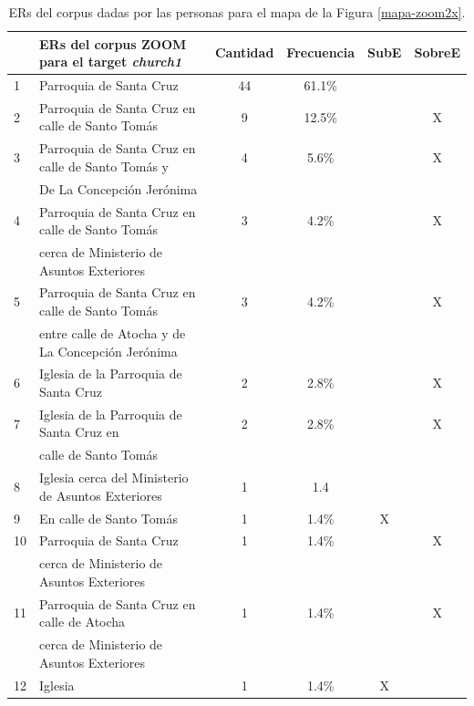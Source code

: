\begin{table}[H]
{\footnotesize
\begin{center}
\begin{tabular}{|l|l|c|c|c|c|}
\hline
&ERs del corpus ZOOM para el target {\it church1}	      & Cantidad &  Frecuencia & SubE&SobreE \\ \hline \hline
1&Parroquia de Santa Cruz        												 &		44&	61.1\%  &  & \\ \hline
2&Parroquia de Santa Cruz en calle de Santo Tom\'as        &    9 &	12.5\%	& &X\\ \hline
3&Parroquia de Santa Cruz en calle de Santo Tom\'as y      &    4 &     5.6\%      & &X\\
&De La Concepci\'on Jer\'onima                             &      &             & & \\ \hline
4&Parroquia de Santa Cruz en calle de Santo Tom\'as        &    3 &     4.2\%      &&X\\
&cerca de Ministerio de Asuntos Exteriores                 &      &             & &\\  \hline
5&Parroquia de Santa Cruz en calle de Santo Tom\'as        &	3 &	4.2\%	& &X\\
&entre calle de Atocha y de La Concepci\'on Jer\'onima     &	  &			&  &\\  \hline
6&Iglesia de la Parroquia de Santa Cruz			   &	2 &	2.8\%	&&X\\  \hline
7&Iglesia de la Parroquia de Santa Cruz	en      	   &	2 &	2.8\%	&&X\\  
&calle de Santo Tom\'as													 				 &		 &	    &  & \\ \hline
8&Iglesia cerca del Ministerio de Asuntos Exteriores       &	1 &	1.4	&&\\  \hline
9&En calle de Santo Tom\'as                                   &    1 &     1.4\%      &X&\\  \hline
10&Parroquia de Santa Cruz  				   &    1 &	1.4\%	&&X\\  
&cerca de Ministerio de Asuntos Exteriores		   &	  &		&&\\  \hline
11&Parroquia de Santa Cruz en calle de Atocha  		   &	1 &	1.4\%	&&X\\  
&cerca de Ministerio de Asuntos Exteriores		   &	  &		&&\\  \hline
12&Iglesia						   &    1 &	1.4\%	&X&\\  \hline
\end{tabular}
\caption{ERs del corpus dadas por las personas para el mapa de la Figura \ref{mapa-zoom2x}.}\label{freq-mapa-zoom2x}
\end{center}
}
\end{table}

